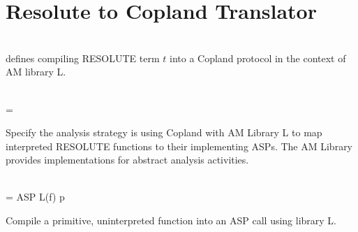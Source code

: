 \section{Resolute to Copland Translator}

\begin{definition}[Compilation]\\
     defines compiling \textsf{RESOLUTE} term $t$ into a
    \textsf{Copland} protocol in the context of AM library L.
  \end{definition}
  
  \begin{definition}[Strategy] \\
     = 
  \end{definition}
  
  Specify the analysis strategy is using Copland with AM Library L to
  map interpreted RESOLUTE functions to their implementing ASPs.  The AM
  Library provides implementations for abstract analysis activities.


\begin{definition}\\
 = ASP L(f) p
\end{definition}

Compile a primitive, uninterpreted function into an ASP call using
library L.